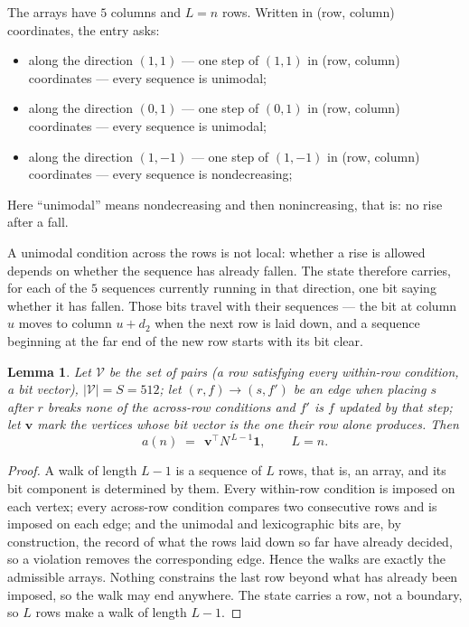 \documentclass[11pt,a4paper]{article}
\theoremstyle{plain}
\newtheorem{lemma}[theorem]{Lemma}
\theoremstyle{definition}
\begin{document}
The arrays have $5$ columns and $L=n$ rows. Written in (row, column)
coordinates, the entry asks:
\begin{itemize}
\item along the direction $(1,1)$ --- one step of $(1,1)$ in (row, column) coordinates --- every sequence is unimodal;
\item along the direction $(0,1)$ --- one step of $(0,1)$ in (row, column) coordinates --- every sequence is unimodal;
\item along the direction $(1,-1)$ --- one step of $(1,-1)$ in (row, column) coordinates --- every sequence is nondecreasing;
\end{itemize}
Here ``unimodal'' means nondecreasing and then nonincreasing, that is: no rise after a fall.

A unimodal condition across the rows is not local: whether a
rise is allowed depends on whether the sequence has already fallen. The state therefore
carries, for each of the $5$ sequences currently running in that direction, one bit saying
whether it has fallen. Those bits travel with their sequences --- the bit at column $u$
moves to column $u+d_2$ when the next row is laid down, and a sequence beginning at the
far end of the new row starts with its bit clear.

\begin{lemma}\label{lem:walk}
Let $\mathcal V$ be the set of pairs (a row satisfying every within-row condition, a
bit vector), $|\mathcal V|=S=512$; let $(r,f)\to(s,f')$ be an edge when placing $s$ after $r$
breaks none of the across-row conditions and $f'$ is $f$ updated by that step; let
$\mathbf{v}$ mark the vertices whose bit vector is the one their row alone produces.
Then
\[
a(n)\;=\;\,\mathbf{v}^{\!\top}N^{\,L-1}\mathbf{1},\qquad L=n.
\]
\end{lemma}

\begin{proof}
A walk of length $L-1$ is a sequence of $L$ rows, that is, an array, and its bit component
is determined by them. Every within-row condition is imposed on each vertex; every
across-row condition compares two consecutive rows and is imposed on each edge; and the
unimodal and lexicographic bits are, by construction, the record of what the rows laid down
so far have already decided, so a violation removes the corresponding edge. Hence the walks
are exactly the admissible arrays. Nothing constrains the last row beyond what has already
been imposed, so the walk may end anywhere. The state carries a row, not a boundary, so
$L$ rows make a walk of length $L-1$.
\end{proof}
\end{document}
